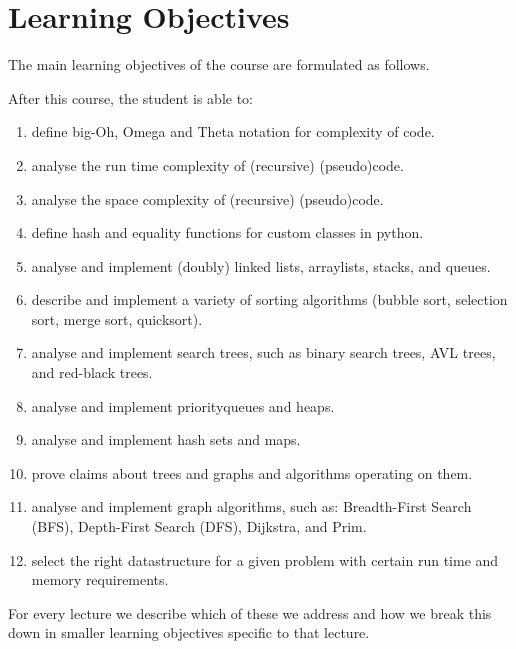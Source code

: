 \section{Learning Objectives}
\label{sec:learning_objectives}

The main learning objectives of the course are formulated as follows.

After this course, the student is able to:
\begin{enumerate}[label=\textbf{LO-\arabic*}]
	\item define big-Oh, Omega and Theta notation for complexity of code. \label{lo:notation}
	\item analyse the run time complexity of (recursive) (pseudo)code. \label{lo:runtime}
	\item analyse the space complexity of (recursive) (pseudo)code. \label{lo:space}
	\item define hash and equality functions for custom classes in python. \label{lo:hash}
	\item analyse and implement (doubly) linked lists, arraylists, stacks, and queues. \label{lo:list} \label{lo:queue}
		\label{lo:stack}
	\item describe and implement a variety of sorting algorithms (bubble sort, selection sort, merge sort, 
		quicksort). \label{lo:sort}
	\item analyse and implement search trees, such as binary search trees, AVL trees, and red-black trees. \label{lo:tree}
	\item analyse and implement priorityqueues and heaps. \label{lo:pqueue} \label{lo:heap}
	\item analyse and implement hash sets and maps. \label{lo:set} \label{lo:map}
	\item prove claims about trees and graphs and algorithms operating on them. \label{lo:prove}
	\item analyse and implement graph algorithms, such as: Breadth-First Search (BFS), Depth-First Search (DFS), Dijkstra, and
		Prim.\label{lo:graph}
	\item select the right datastructure for a given problem with certain run time and memory requirements. \label{lo:selecting}
\end{enumerate}

For every lecture we describe which of these we address and how we break this down in smaller learning objectives
specific to that lecture.

